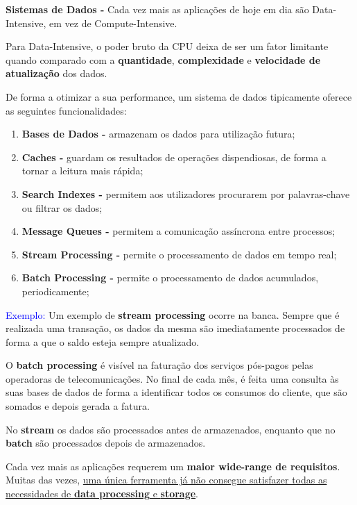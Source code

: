 \documentclass{article}
\begin{document}
\begin{flushleft}
    \textbf{Sistemas de Dados -} Cada vez mais as aplicações de hoje em dia
    são Data-Intensive, em vez de Compute-Intensive. 

    Para Data-Intensive, o poder bruto da CPU deixa de ser um fator limitante
    quando comparado com a \textbf{quantidade}, \textbf{complexidade} e \textbf{velocidade de atualização} dos dados.

    \vspace{3mm}

    De forma a otimizar a sua performance, um sistema de dados tipicamente oferece as seguintes
    funcionalidades:
    \begin{enumerate}
      \item \textbf{Bases de Dados -} armazenam os dados para utilização futura;
      \item \textbf{Caches -} guardam os resultados de operações dispendiosas, de forma a tornar a leitura mais rápida;
      \item \textbf{Search Indexes -} permitem aos utilizadores procurarem por palavras-chave ou filtrar os dados;
      \item \textbf{Message Queues -} permitem a comunicação assíncrona entre processos;
      \item \textbf{Stream Processing -} permite o processamento de dados em tempo real;
      \item \textbf{Batch Processing -} permite o processamento de dados acumulados, periodicamente;
    \end{enumerate}

    \textcolor{Blue}{Exemplo:}
    Um exemplo de \textbf{stream processing} ocorre na banca. Sempre que é realizada uma transação, os dados da mesma são
  imediatamente processados de forma a que o saldo esteja sempre atualizado.


  O \textbf{batch processing} é visível na faturação dos serviços pós-pagos pelas operadoras de telecomunicações. No final de
  cada mês, é feita uma consulta às suas bases de dados de forma a identificar todos os consumos do cliente, que são
  somados e depois gerada a fatura.


  No \textbf{stream} os dados são processados antes de armazenados, enquanto que no \textbf{batch} são processados depois de
  armazenados.

  \vspace{3mm}

  Cada vez mais as aplicações requerem um \textbf{maior wide-range de requisitos}. Muitas das vezes,
  \uline{uma única ferramenta já não consegue satisfazer todas as necessidades de \textbf{data processing} e \textbf{storage}}.


\end{flushleft}
\end{document}

